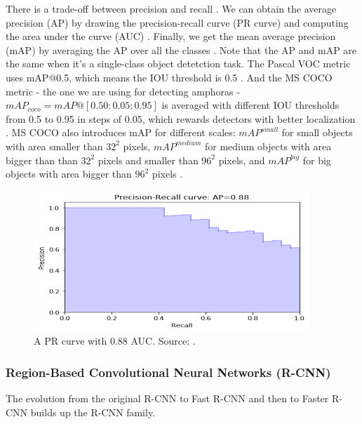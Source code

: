 \documentclass[a4paper, 11pt, oneside]{article}
\begin{document}
  There is a trade-off between precision and recall
  \cite{elgendy2020deep, geron2019hands, burkov2019hundred, planche2019hands}. We can obtain the average precision
  (AP) by drawing the precision-recall curve (PR curve) and computing the area under the curve (AUC)
  \cite{elgendy2020deep, planche2019hands}. Finally, we get the mean average precision (mAP) by averaging
  the AP over all the classes \cite{elgendy2020deep, geron2019hands, planche2019hands}. Note that the AP and mAP are the
  same when it's a single-class object detetction task. The Pascal VOC metric uses mAP@0.5, which means the IOU threshold
  is 0.5 \cite{liu2020deep, everingham2010pascal, planche2019hands}. And the MS COCO metric - the one we are using for
  detecting amphoras - $mAP_{coco} = mAP@[0.50:0.05:0.95]$ is averaged with different IOU thresholds from 0.5 to 0.95 in
  steps of 0.05, which rewards detectors with better localization \cite{liu2020deep, planche2019hands, cocometrics}. MS
  COCO also introduces mAP for different scales: $mAP^{small}$ for small objects with area smaller than $32^2$ pixels,
  $mAP^{medium}$ for medium objects with area bigger than than $32^2$ pixels and smaller than $96^2$ pixels, and
  $mAP^{big}$ for big objects with area bigger than $96^2$ pixels \cite{liu2020deep, cocometrics}.

  \begin{figure}[ht]
    \begin{center}
      \includegraphics[width=.8\textwidth]{pr_curve.png}
    \end{center}
    \caption{A PR curve with 0.88 AUC. Source: \cite{planche2019hands}.}
  \end{figure}

  \subsubsection{Region-Based Convolutional Neural Networks (R-CNN)}

  The evolution from the original R-CNN \cite{girshick2014rich} to Fast R-CNN \cite{girshick2015fast} and then to
  Faster R-CNN \cite{ren2015faster} builds up the R-CNN family.
\end{document}
